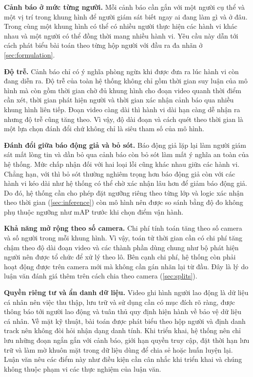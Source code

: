 \textbf{Cảnh báo ở mức từng người.} Mỗi cảnh báo cần gắn với một người cụ thể và một vị trí trong khung hình để người giám sát biết ngay ai đang làm gì và ở đâu. Trong cùng một khung hình có thể có nhiều người thực hiện các hành vi khác nhau và một người có thể đồng thời mang nhiều hành vi. Yêu cầu này dẫn tới cách phát biểu bài toán theo từng hộp người với đầu ra đa nhãn ở \cref{sec:formulation}.

\textbf{Độ trễ.} Cảnh báo chỉ có ý nghĩa phòng ngừa khi được đưa ra lúc hành vi còn đang diễn ra. Độ trễ của toàn hệ thống không chỉ gồm thời gian suy luận của mô hình mà còn gồm thời gian chờ đủ khung hình cho đoạn video quanh thời điểm cần xét, thời gian phát hiện người và thời gian xác nhận cảnh báo qua nhiều khung hình liên tiếp. Đoạn video càng dài thì hành vi dài hạn càng dễ nhận ra nhưng độ trễ cũng tăng theo. Vì vậy, độ dài đoạn và cách quét theo thời gian là một lựa chọn đánh đổi chứ không chỉ là siêu tham số của mô hình.

\textbf{Đánh đổi giữa báo động giả và bỏ sót.} Báo động giả lặp lại làm người giám sát mất lòng tin và dần bỏ qua cảnh báo còn bỏ sót làm mất ý nghĩa an toàn của hệ thống. Mức chấp nhận đối với hai loại lỗi cũng khác nhau giữa các hành vi. Chẳng hạn, với  thì bỏ sót thường nghiêm trọng hơn báo động giả còn với các hành vi kéo dài như  hệ thống có thể chờ xác nhận lâu hơn để giảm báo động giả. Do đó, hệ thống cần cho phép đặt ngưỡng riêng theo từng lớp và logic xác nhận theo thời gian (\cref{sec:inference}) còn mô hình nên được so sánh bằng độ đo không phụ thuộc ngưỡng như mAP trước khi chọn điểm vận hành.

\textbf{Khả năng mở rộng theo số camera.} Chi phí tính toán tăng theo số camera và số người trong mỗi khung hình. Vì vậy, toán tử thời gian cần có chi phí tăng chậm theo độ dài đoạn video và các thành phần dùng chung như bộ phát hiện người nên được tổ chức để xử lý theo lô. Bên cạnh chi phí, hệ thống còn phải hoạt động được trên camera mới mà không cần gán nhãn lại từ đầu. Đây là lý do luận văn đánh giá thêm trên cách chia theo camera (\cref{sec:splits}).

\textbf{Quyền riêng tư và ẩn danh dữ liệu.} Video ghi hình người lao động là dữ liệu cá nhân nên việc thu thập, lưu trữ và sử dụng cần có mục đích rõ ràng, được thông báo tới người lao động và tuân thủ quy định hiện hành về bảo vệ dữ liệu cá nhân. Về mặt kỹ thuật, bài toán được phát biểu theo hộp người và định danh track nên không đòi hỏi nhận dạng danh tính. Khi triển khai, hệ thống nên chỉ lưu những đoạn ngắn gắn với cảnh báo, giới hạn quyền truy cập, đặt thời hạn lưu trữ và làm mờ khuôn mặt trong dữ liệu dùng để chia sẻ hoặc huấn luyện lại. Luận văn nêu các điểm này như điều kiện cần cân nhắc khi triển khai và chúng không thuộc phạm vi các thực nghiệm của luận văn.

